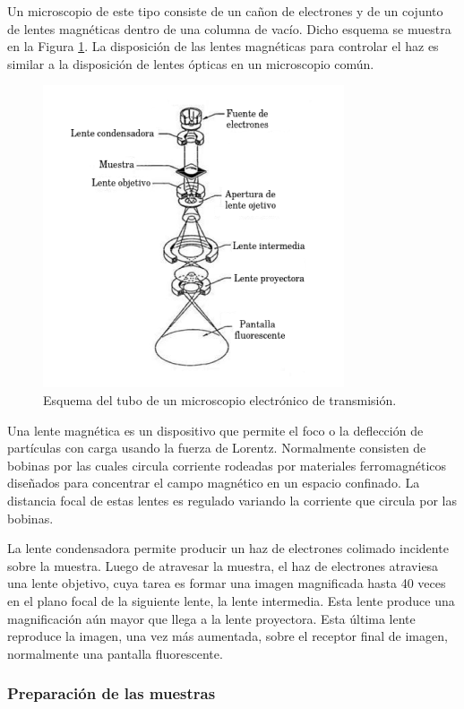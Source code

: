 \documentclass{article}
\theoremstyle{definition}
\theoremstyle{remark}
\begin{document}
Un microscopio de este tipo consiste de un cañon de electrones y de un cojunto de lentes magnéticas dentro de una columna de vacío. Dicho esquema se muestra en la Figura \ref{TEM}. La disposición de las lentes magnéticas para controlar el haz es similar a la disposición de lentes ópticas en un microscopio común.

 \begin{figure}[H]
 	\centering
	\includegraphics[scale=0.5]{img/TEM.png}
 	\caption{Esquema del tubo de un microscopio electrónico de transmisión.}
	\label{TEM}
\end{figure} 

Una lente magnética es un dispositivo que permite el foco o la deflección de partículas con carga usando la fuerza de Lorentz. Normalmente consisten de bobinas por las cuales circula corriente rodeadas por materiales ferromagnéticos diseñados para concentrar el campo magnético en un espacio confinado. La distancia focal de estas lentes es regulado variando la corriente que circula por las bobinas.

La lente condensadora permite producir un haz de electrones colimado incidente sobre la muestra. Luego de atravesar la muestra, el haz de electrones atraviesa una lente objetivo, cuya tarea es formar una imagen magnificada hasta 40 veces en el plano focal de la siguiente lente, la lente intermedia. Esta lente produce una magnificación aún mayor que llega a la lente proyectora. Esta última lente reproduce la imagen, una vez más aumentada, sobre el receptor final de imagen, normalmente una pantalla fluorescente.

\subsubsection{Preparación de las muestras}
\end{document}
